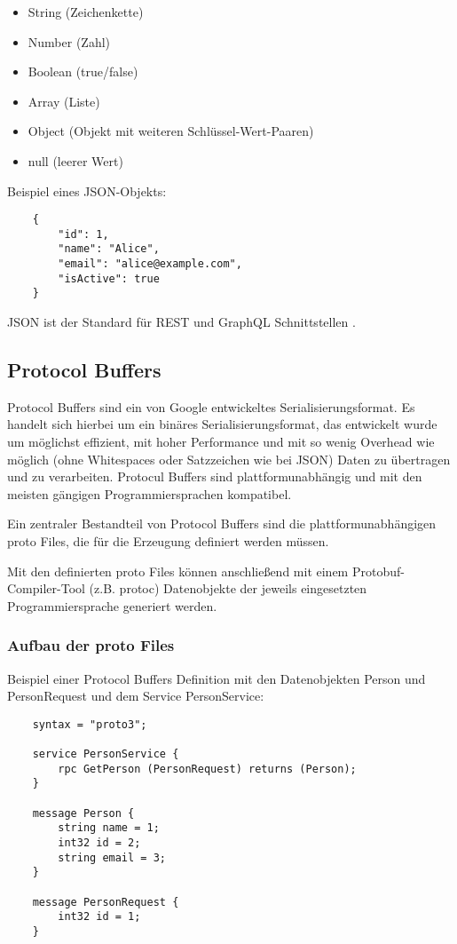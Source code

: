 \begin{itemize}
	\item String (Zeichenkette)
	\item Number (Zahl)
	\item Boolean (true/false)
	\item Array (Liste)
	\item Object (Objekt mit weiteren Schl\"ussel-Wert-Paaren)
	\item null (leerer Wert)
\end{itemize}
\parencite{ecma404-2017}

Beispiel eines JSON-Objekts:
\begin{verbatim}
	{
		"id": 1,
		"name": "Alice",
		"email": "alice@example.com",
		"isActive": true
	}
\end{verbatim}

JSON ist der Standard für REST und GraphQL Schnittstellen \parencite{Microsoft2025,GraphQL2025}. 




\subsection{Protocol Buffers}
Protocol Buffers sind ein von Google entwickeltes Serialisierungsformat. Es handelt sich hierbei um ein binäres Serialisierungsformat, das entwickelt wurde um möglichst effizient, mit hoher Performance und mit so wenig Overhead wie möglich (ohne Whitespaces oder Satzzeichen wie bei JSON) Daten zu übertragen und zu verarbeiten. Protocul Buffers sind plattformunabhängig und mit den meisten gängigen Programmiersprachen kompatibel.

Ein zentraler Bestandteil von Protocol Buffers sind die plattformunabhängigen proto Files, die für die Erzeugung definiert werden müssen.

Mit den definierten proto Files können anschließend mit einem Protobuf-Compiler-Tool (z.B. protoc) Datenobjekte der jeweils eingesetzten Programmiersprache generiert werden.

\subsubsection*{Aufbau der proto Files}

Beispiel einer Protocol Buffers Definition mit den Datenobjekten Person und PersonRequest und dem Service PersonService:
\begin{verbatim}
	syntax = "proto3";
	
	service PersonService {
		rpc GetPerson (PersonRequest) returns (Person);
	}
	
	message Person {
		string name = 1;
		int32 id = 2;
		string email = 3;
	}
	
	message PersonRequest {
		int32 id = 1;
	}
\end{verbatim}

